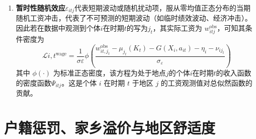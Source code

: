 \documentclass[
  a4paper,
  zihao=-4,
  fontset=mac,
  AutoFakeBold,
  AutoFakeSlant,
  oneside]{ctexbook}
\begin{document}
\begin{enumerate}
  \item \textbf{暂时性随机效应}$\varepsilon_{itj}$代表短期波动或随机扰动项，服从零均值正态分布的当期随机工资冲击，代表了不可预测的短期波动（如临时绩效波动、经济冲击）。
  因此若在数据中观测到个体$i$在时期$t$的写为$j_t$，其实际工资为 $w_{itj}^{\mathrm{obs}}$，可知其条件密度为
  \begin{equation}
  \mathcal{L}{i,t}^{\text{wage}} = \frac{1}{\sigma\varepsilon}\phi\left(\frac{w_{it,j_t}^{\mathrm{obs}}-\mu_{j_t}(K_t)-G(X_i,a_{it})-\eta_i-\nu_{ij_t}}{\sigma_\varepsilon}\right)
  \label{eq:工资自然贡献}
  \end{equation}
  其中 $\phi(\cdot)$ 为标准正态密度，该方程为处于地点$j$的个体$i$在时期$t$的收入函数的密度函数$\Psi_{itj}$。这是个体 $i$ 在时期 $t$ 于地区 $j$ 的工资观测值对总似然函数的贡献。
\end{enumerate}



\section{户籍惩罚、家乡溢价与地区舒适度}
\end{document}
